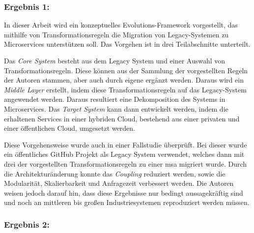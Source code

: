 \subsubsection{Ergebnis 1:   \cite{arh-result-no-filter-1}}

In dieser Arbeit wird ein konzeptuelles Evolutions-Framework vorgestellt, das mithilfe von Trans\-for\-ma\-tions\-re\-geln die Migration von Legacy-Systemen zu Microservices unterstützen soll.
Das Vorgehen ist in drei Teilabschnitte unterteilt. 

Das \emph{Core System} besteht aus dem Legacy System und einer Auswahl von Transformationsregeln.
Diese können aus der Sammlung der vorgestellten Regeln der Autoren stammen, aber auch durch eigene ergänzt werden.
Daraus wird ein \emph{Middle Layer} erstellt, indem diese Transformationsregeln auf das Legacy-System angewendet werden.
Daraus resultiert eine Dekomposition des Systems in Microservices.
Das \emph{Target System} kann dann entwickelt werden, indem die erhaltenen Services in einer hybriden Cloud, bestehend aus einer privaten und einer öffentlichen Cloud, umgesetzt werden.

Diese Vorgehensweise wurde auch in einer Fallstudie überprüft.
Bei dieser wurde ein öffentliches GitHub Projekt als Legacy System verwendet, welches dann mit drei der vorgestellten Trans\-for\-ma\-tions\-regeln zu einer \gls{msa} migriert wurde.
Durch die Architekturänderung konnte das \emph{Coupling} reduziert werden, sowie die Modularität, Skalierbarkeit und Anfragezeit verbessert werden.
Die Autoren weisen jedoch darauf hin, dass diese Ergebnisse nur bedingt aussagekräftig sind und noch an mittleren bis großen Industriesystemen reproduziert werden müssen.


\subsubsection{Ergebnis 2:  \cite{arh-result-no-filter-3}}

